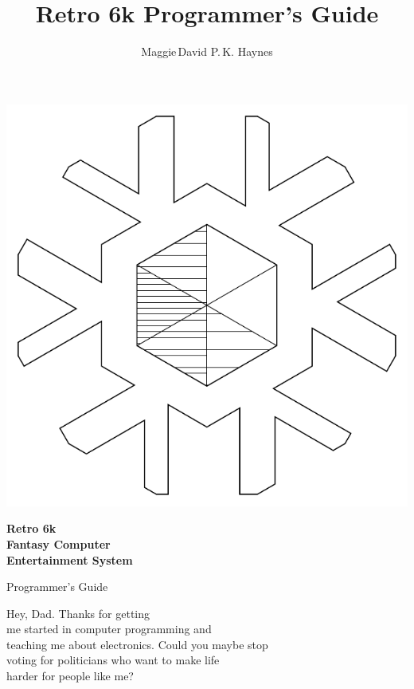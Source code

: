 \documentclass[12pt]{{memoir}}
\begin{document}
\title{Retro 6k Programmer's Guide}
\author{Maggie\,David P.\,K. Haynes}
\pagestyle{empty}
\begin{center}
\includegraphics{../common-src/logolineart}

{\sffamily\bfseries\Huge{}Retro 6k\\Fantasy Computer\\Entertainment System

Programmer's Guide\par}
{\sffamily\bfseries\large\theauthor\par}
\end{center}
\cleartoverso
{}
\begin{center}
\noindent{}Hey, Dad. Thanks for getting \\
me started in computer programming and \\
teaching me about electronics. Could you maybe stop \\
voting for politicians who want to make life \\
harder for people like me?\par
\end{center}
\end{document}
